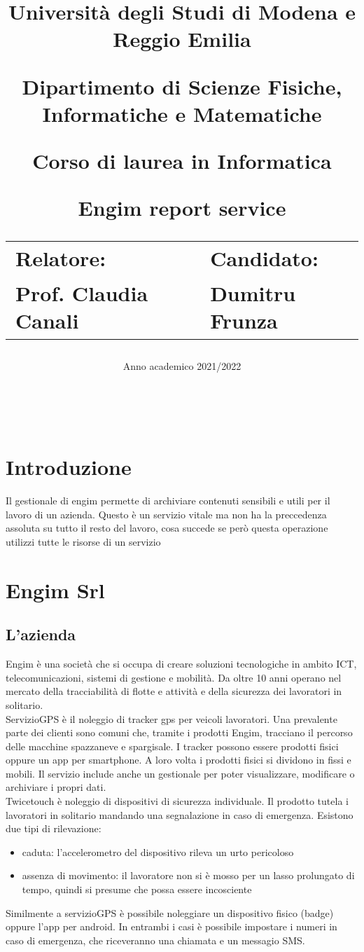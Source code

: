 \documentclass[12pt]{article}
\author{}
\title{
    \huge 
        \textbf{Università degli Studi di Modena e Reggio Emilia}
    \large
        \par Dipartimento di Scienze Fisiche, Informatiche e Matematiche
        \par Corso di laurea in Informatica
    \vfil
        \huge \par \textbf{Engim report service}
    \vfil
    \normalsize
    \begin{tabular}{lp{0.4\textwidth}l}
      Relatore: & & Candidato: \\
      Prof. Claudia Canali & &  Dumitru Frunza \\
      \end{tabular}
}
\date{Anno academico 2021/2022}
\begin{document}
\maketitle
\thispagestyle{empty}
\newpage 
\thispagestyle{empty}
\
\newpage
{}
\addtocounter{page}{0}
\listoffigures
\newpage
{}
\tableofcontents
{}
\newpage
{}
\addtocounter{page}{0}

\section{Introduzione}
Il gestionale di engim permette di archiviare contenuti sensibili e utili per il 
lavoro di un azienda. Questo è un servizio vitale ma non ha la preccedenza assoluta 
su tutto il resto del lavoro, cosa succede se però questa operazione utilizzi 
tutte le risorse di un servizio 
\section{Engim Srl}
\subsection{L'azienda}
Engim è una società che si occupa di creare soluzioni tecnologiche in ambito 
ICT, telecomunicazioni, sistemi di gestione e mobilità. Da oltre 10 anni operano 
nel mercato della tracciabilità di flotte e attività e della 
sicurezza dei lavoratori in solitario.
\\ ServizioGPS è il noleggio di tracker gps per veicoli lavoratori. 
Una prevalente parte dei clienti sono comuni che, tramite i prodotti Engim, 
tracciano il percorso delle macchine spazzaneve e spargisale.
I tracker possono essere prodotti fisici oppure un app per smartphone. A loro 
volta i prodotti fisici si dividono in fissi e mobili. Il servizio include
anche un gestionale per poter visualizzare, modificare o archiviare i propri dati.
\\ Twicetouch è noleggio di dispositivi di sicurezza individuale.
Il prodotto tutela i lavoratori in solitario mandando una segnalazione in caso di
emergenza. Esistono due tipi di rilevazione: 
\begin{itemize}
  \item caduta: l'accelerometro del dispositivo rileva un urto pericoloso
  \item assenza di movimento: il lavoratore non si è mosso per un lasso prolungato di tempo, 
  quindi si presume che possa essere incosciente
\end{itemize}
Similmente a servizioGPS è possibile noleggiare un dispositivo fisico (badge) oppure
l'app per android. In entrambi i casi è possibile impostare i numeri in caso di 
emergenza, che riceveranno una chiamata e un messagio SMS.
\end{document}
